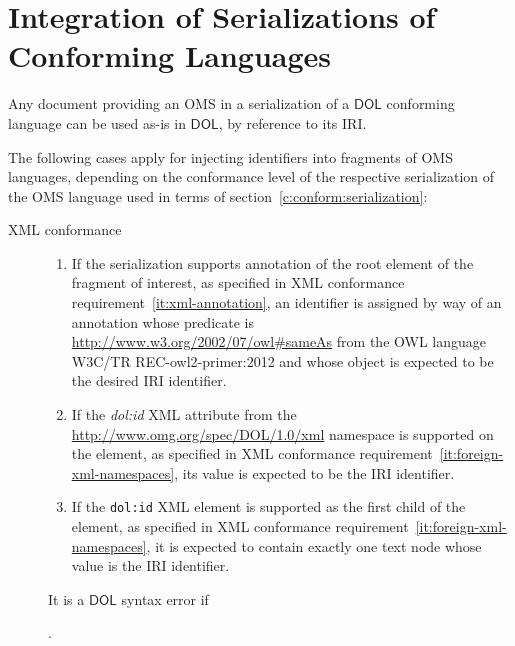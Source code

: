 \documentclass[10pt,fleqn,final]{scrreprt}
\newcommand*{\DOL}{\ensuremath{\mathsf{DOL}}\xspace}
\newcommand{\sclause}[1]{\section{#1}}
\newcommand{\nisref}[1]{#1}
\newenvironment{definitions}[0]{\medskip }{}
\begin{document}
\begin{definitions}

\sclause{Integration of Serializations of Conforming Languages}
\label{sec:existing-serialization}
Any document providing an OMS in a serialization of a \DOL conforming
language can be used as-is in \DOL, by reference to its IRI.

The following cases apply for injecting identifiers into fragments of OMS languages, depending on the conformance level of the respective serialization of the OMS language used in terms of section~\ref{c:conform:serialization}:
\begin{description}
\item[XML conformance]
  \begin{enumerate}
  \item If the serialization supports annotation of the root element of the fragment of interest, as specified in XML conformance requirement~\ref{it:xml-annotation}, an identifier is assigned by way of an annotation whose predicate is \url{http://www.w3.org/2002/07/owl#sameAs} from the OWL language \nisref{W3C/TR REC-owl2-primer:2012} and whose object is expected to be the desired IRI identifier.
  \item If the \textit{dol:id} XML attribute from the \url{http://www.omg.org/spec/DOL/1.0/xml} namespace is supported on the element, as specified in XML conformance requirement~\ref{it:foreign-xml-namespaces}, its value is expected to be the IRI identifier.
  \item If the \texttt{dol:id} XML element is supported as the first child of the element, as specified in XML conformance requirement~\ref{it:foreign-xml-namespaces}, it is expected to contain exactly one text node whose value is the IRI identifier.
  \end{enumerate}
  It is a \DOL syntax error if .

\end{description}
\end{definitions}
\end{document}
